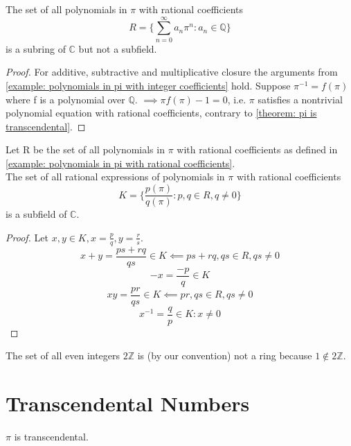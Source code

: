 \documentclass{book}
\begin{document}
\begin{examples}
    \begin{example} \label{example: polynomials in pi with rational coefficients}
        The set of all polynomials in \(\pi\) with rational coefficients
        \[R = \{\sum_{n = 0}^\infty a_n\pi^n : a_n \in \mathbb{Q}\}\]
        is a subring of \(\mathbb{C}\) but not a subfield.
    \end{example}
    \begin{proof}
        For additive, subtractive and multiplicative closure the arguments from \cref{example: polynomials in pi with integer coefficients} hold.
        Suppose \(\pi^{-1} = f(\pi)\) where f is a polynomial over \(\mathbb{Q}\).
        \(\implies \pi f(\pi) - 1 = 0\), i.e. \(\pi\) satisfies a nontrivial polynomial equation with rational coefficients,
        contrary to \cref{theorem: pi is transcendental}. 
    \end{proof}

    \begin{example}
        Let R be the set of all polynomials in \(\pi\) with rational coefficients
        as defined in \cref{example: polynomials in pi with rational coefficients}.\\
        The set of all rational expressions of polynomials in \(\pi\) with rational coefficients
        \[K = \{\frac{p(\pi)}{q(\pi)} : p,q \in R, q \neq 0\}\]
        is a subfield of \(\mathbb{C}\).
    \end{example}
    \begin{proof}
        Let \(x,y \in K,x = \frac{p}{q},y = \frac{r}{s}\).
        \[x + y = \frac{ps + rq}{qs} \in K \impliedby ps + rq,qs \in R,qs \neq 0\]
        \[-x = \frac{-p}{q} \in K\]
        \[xy = \frac{pr}{qs} \in K \impliedby pr,qs \in R,qs \neq 0\]
        \[x^{-1} = \frac{q}{p} \in K : x \neq 0\]
    \end{proof}

    \begin{example}
        The set of all even integers \(2\mathbb{Z}\) is (by our convention) not a ring because \(1 \notin 2\mathbb{Z}\).
    \end{example}
    \end{examples}

    \chapter{Transcendental Numbers}
    \begin{theorem} \label{theorem: pi is transcendental}
        \(\pi\) is transcendental.
    \end{theorem}
\end{document}

